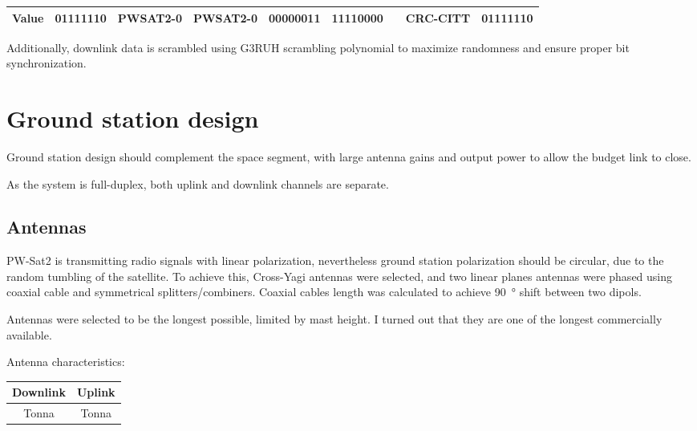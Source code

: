 \begin{table}
\begin{tabular}{l|c|c|c|c|c|c|c|c|}
\hline
\multicolumn{1}{|c|}{Value}                                                    & 01111110               & PWSAT2-0                                                     & PWSAT2-0                                                & 00000011                                              & 11110000                                                     & {\cellcolor[rgb]{0.753,0.753,0.753}}                                                                                                                  & CRC-CITT                                                                         & 01111110               \\
\hline
\end{tabular}
\end{table}


Additionally, downlink data is scrambled using G3RUH scrambling polynomial to maximize randomness and ensure proper bit synchronization.


\chapter{Ground station design}
Ground station design should complement the space segment, with large antenna gains and output power to allow the budget link to close.

As the system is full-duplex, both uplink and downlink channels are separate.

\section{Antennas}
PW-Sat2 is transmitting radio signals with linear polarization, nevertheless ground station  polarization should be circular, due to the random tumbling of the satellite. To achieve this, Cross-Yagi antennas were selected, and two linear planes antennas were phased using coaxial cable and symmetrical splitters/combiners. Coaxial cables length was calculated to achieve \SI{90}{\degree} shift between two dipols.


Antennas were selected to be the longest possible, limited by mast height. I turned out that they are one of the longest commercially available. 

Antenna characteristics:

\begin{tabular}{c|c}
     \textbf{Downlink} & \textbf{Uplink} \\ \hline
     Tonna & Tonna \\
\end{tabular}


